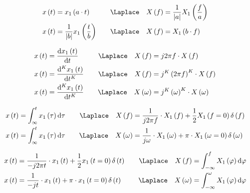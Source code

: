 \begin{boxleft}
\end{boxleft}\begin{boxrightshaded}
\begin{align*}
x\left(t\right)&=x_1\left(a\cdot t\right)\quad&\Laplace\quad X\left(f\right)&=\frac{1}{\left|a\right|}X_1\left(\frac{f}{a}\right)\\
x\left(t\right)&=\frac{1}{\left|b\right|}x_1\left(\frac{t}{b}\right)\quad&\Laplace\quad X\left(f\right)&=X_1\left(b\cdot f\right)
\end{align*}
\end{boxrightshaded}

\begin{boxleft}
\end{boxleft}\begin{boxrightshaded}
\begin{align*}
x\left(t\right)&=\frac{\diff x_1\left(t\right)}{\diff t}\quad&\Laplace\quad X\left(f\right)&=j2\pi f\cdot X\left(f\right)\\
x\left(t\right)&=\frac{\diff^K x_1\left(t\right)}{\diff t^K}\quad&\Laplace\quad X\left(f\right)&=j^K\left(2\pi f\right)^K\cdot X\left(f\right)\\
x\left(t\right)&=\frac{\diff^K x_1\left(t\right)}{\diff t^K}\quad&\Laplace\quad X\left(\omega\right)&=j^K\left(\omega\right)^K\cdot X\left(\omega\right)
\end{align*}
\end{boxrightshaded}

\begin{boxleft}
\end{boxleft}\begin{boxrightshaded}
\begin{align*}
x\left(t\right)&=\int_\infty^tx_1\left(\tau\right)\diff\tau\quad&\Laplace\quad X\left(f\right)&=\frac{1}{j2\pi f}\cdot X_1\left(f\right)+\frac{1}{2}X_1\left(f=0\right)\delta\left(f\right)\\
x\left(t\right)&=\int_\infty^tx_1\left(\tau\right)\diff\tau\quad&\Laplace\quad X\left(\omega\right)&=\frac{1}{j \omega}\cdot X_1\left(\omega\right)+\pi\cdot X_1\left(\omega=0\right)\delta\left(\omega\right)
\end{align*}
\end{boxrightshaded}

\begin{boxleft}
\end{boxleft}\begin{boxrightshaded}
\begin{align*}
x\left(t\right)&=\frac{1}{-j2\pi t}\cdot x_1\left(t\right)+\frac{1}{2}x_1\left(t=0\right)\delta\left(t\right)\quad&\Laplace\quad X\left(f\right)&=\int_{-\infty}^{f}X_1\left(\varphi\right)\diff \varphi\\
x\left(t\right)&=\frac{1}{-j t}\cdot x_1\left(t\right)+\pi\cdot x_1\left(t=0\right)\delta\left(t\right)\quad&\Laplace\quad X\left(\omega\right)&=\int_{-\infty}^{\omega}X_1\left(\varphi\right)\diff \varphi
\end{align*}
\end{boxrightshaded}

